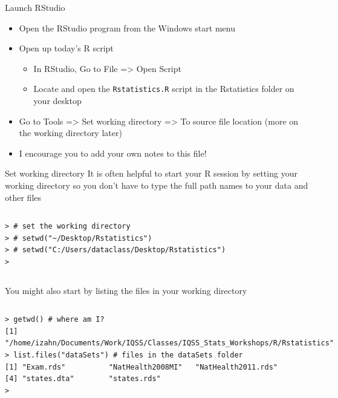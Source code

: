 \documentclass[table,smaller]{beamer}
\begin{document}
\begin{frame}[fragile,label=sec-1-3]{Launch RStudio}
 \begin{itemize}
\item Open the RStudio program from the Windows start menu

\item Open up today's R script
\begin{itemize}
\item In RStudio, Go to \alert{File => Open Script}
\item Locate and open the \texttt{Rstatistics.R} script in the Rstatistics folder on your desktop
\end{itemize}

\item Go to \alert{Tools => Set working directory => To source file location} (more on the working directory later)
\item I encourage you to add your own notes to this file!
\end{itemize}
\end{frame}


\begin{frame}[fragile,label=sec-1-4]{Set working directory}
 It is often helpful to start your R session by setting your working directory so you don't have to type the full path names to your data and other files

\vspace{-.5em}
\begin{columns}
\begin{block}{}
\begin{verbatim}
> # set the working directory
> # setwd("~/Desktop/Rstatistics")
> # setwd("C:/Users/dataclass/Desktop/Rstatistics")
>
\end{verbatim}
\end{block}
\end{columns}
\vspace{.5em}

You might also start by listing the files in your working directory
\vspace{-.5em}
\begin{columns}
\begin{block}{}
\begin{verbatim}
> getwd() # where am I?
[1] "/home/izahn/Documents/Work/IQSS/Classes/IQSS_Stats_Workshops/R/Rstatistics"
> list.files("dataSets") # files in the dataSets folder
[1] "Exam.rds"          "NatHealth2008MI"   "NatHealth2011.rds"
[4] "states.dta"        "states.rds"       
>
\end{verbatim}
\end{block}
\end{columns}
\vspace{.5em}
\end{frame}
\end{document}
